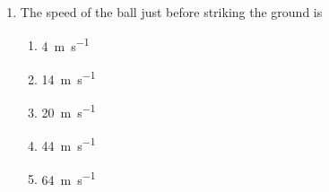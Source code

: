 \documentclass{../../oss-apphys}
\begin{document}
\begin{multicols}{2}
\begin{enumerate}[leftmargin=18pt]
  \item The speed of the ball just before striking the ground is
    \begin{enumerate}[noitemsep,topsep=0pt,leftmargin=18pt,label=(\Alph*)]
    \item\SI{4 }{\metre\per\second}
    \item\SI{14}{\metre\per\second}
    \item\SI{20}{\metre\per\second}
    \item\SI{44}{\metre\per\second}
    \item\SI{64}{\metre\per\second}
    \end{enumerate}
    \columnbreak
%  
%
%
    

\end{enumerate}
\end{multicols}
\end{document}
